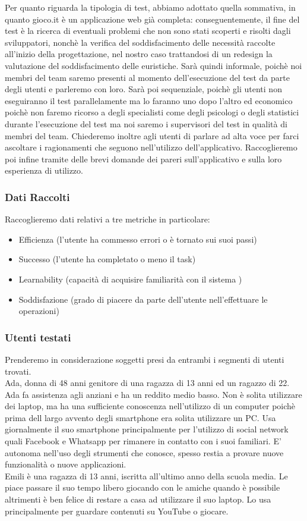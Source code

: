 \documentclass[../Report.tex]{subfiles}
\begin{document}
    Per quanto riguarda la tipologia di test, abbiamo adottato quella sommativa, in quanto gioco.it è un applicazione web già completa: conseguentemente, il fine del test è la ricerca di eventuali problemi che non sono stati scoperti e risolti dagli sviluppatori, nonchè la verifica del soddisfacimento delle necessità raccolte all’inizio della progettazione, nel nostro caso trattandosi di un redesign la valutazione del soddisfacimento delle euristiche. 
    Sarà quindi informale, poichè noi membri del team saremo presenti al momento dell’esecuzione del test da parte degli utenti e parleremo con loro. Sarà poi sequenziale, poichè gli utenti non eseguiranno il test parallelamente ma lo faranno uno dopo l’altro ed economico poichè non faremo ricorso a degli specialisti come degli psicologi o degli statistici durante l’esecuzione del test ma noi saremo i supervisori del test in qualità di membri del team. 
    Chiederemo inoltre agli utenti di parlare ad alta voce per farci ascoltare i ragionamenti che seguono nell’utilizzo dell’applicativo. Raccoglieremo poi infine tramite delle brevi domande dei pareri sull’applicativo e sulla loro esperienza di utilizzo.

    \subsubsection{Dati Raccolti}
    Raccoglieremo dati relativi a tre metriche in particolare:
    \begin{itemize}
        \item Efficienza (l’utente ha commesso errori o è tornato sui suoi passi)
        \item Successo (l’utente ha completato o meno il task)
        \item Learnability (capacità di acquisire familiarità con il sistema )
        \item Soddisfazione (grado di piacere da parte dell’utente nell’effettuare le operazioni)
    \end{itemize}
    \subsubsection{Utenti testati}
    Prenderemo in considerazione soggetti presi da entrambi i segmenti di utenti trovati.\\
    Ada, donna di 48 anni genitore di una ragazza di 13 anni ed un ragazzo di 22. Ada fa assistenza agli anziani e ha un reddito medio basso. Non è solita utilizzare dei laptop, ma ha una sufficiente conoscenza nell’utilizzo di un computer poichè prima dell largo avvento degli smartphone era solita utilizzare un PC. Usa giornalmente il suo smartphone principalmente per l’utilizzo di social network quali Facebook e Whatsapp per rimanere in contatto con i suoi familiari. E’ autonoma nell’uso degli strumenti che conosce, spesso restia a provare nuove funzionalità o nuove applicazioni.\\
    Emili è una ragazza di 13 anni, iscritta all’ultimo anno della scuola media. Le piace passare il suo tempo libero giocando con le amiche quando è possibile altrimenti è ben felice di restare a casa ad utilizzare il suo laptop. Lo usa principalmente per guardare contenuti su YouTube o giocare. 
\end{document}
